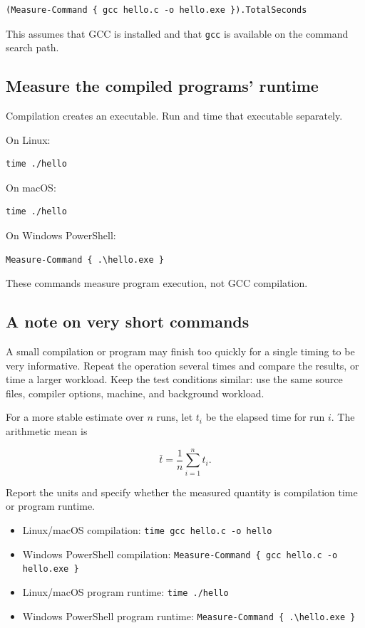 \documentclass[a4paper, 10pt, onepage]{elegantbook}
\begin{document}
{\begin{lstlisting}
(Measure-Command { gcc hello.c -o hello.exe }).TotalSeconds
\end{lstlisting}

This assumes that GCC is installed and that \texttt{gcc} is available on
the command search path.

\subsection{Measure the compiled programs' runtime}

Compilation creates an executable. Run and time that executable separately.

On Linux:

\begin{lstlisting}
time ./hello
\end{lstlisting}

On macOS:

\begin{lstlisting}
time ./hello
\end{lstlisting}

On Windows PowerShell:

\begin{lstlisting}
Measure-Command { .\hello.exe }
\end{lstlisting}

These commands measure program execution, not GCC compilation.

\subsection{A note on very short commands}

\noindent

A small compilation or program may finish too quickly for a single timing
to be very informative. Repeat the operation several times and compare
the results, or time a larger workload. Keep the test conditions similar:
use the same source files, compiler options, machine, and background
workload.  

For a more stable estimate over \(n\) runs, let \(t_i\) be the elapsed time
for run \(i\). The arithmetic mean is

\[
\bar{t} = \frac{1}{n}\sum_{i=1}^{n} t_i.
\]

Report the units and specify whether the measured quantity is compilation
time or program runtime.

\begin{itemize}
  \item Linux/macOS compilation: \texttt{time gcc hello.c -o hello}
  \item Windows PowerShell compilation:
        \texttt{Measure-Command \{ gcc hello.c -o hello.exe \}}
  \item Linux/macOS program runtime: \texttt{time ./hello}
  \item Windows PowerShell program runtime:
        \texttt{Measure-Command \{ .\textbackslash hello.exe \}}
\end{itemize}

}
\end{document}
